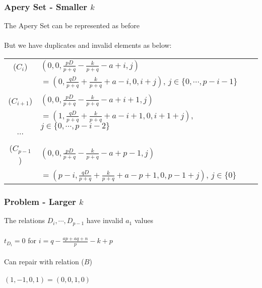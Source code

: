 \documentclass{beamer}
\begin{document}
\begin{frame}[noframenumbering]
\begin{center}
\frametitle{Apery Set - Smaller $k$}

The Apery Set can be represented as before\\

~\\

But we have duplicates and invalid elements as below:

{\footnotesize
\begin{center}
\begin{tabular}{cl}
($C_{i}$) & $\left(0, 0, \frac{p D}{p + q} - \frac{k}{p + q} - a + i , j\right)$\\
& $ = \left(0, \frac{q D}{p + q} + \frac{k}{p + q} + a - i, 0, i + j\right)$, $j \in \{ 0, \cdots, p - i - 1 \}$\\
 &\\
($C_{i + 1}$) & $\left(0, 0, \frac{p D}{p + q} - \frac{k}{p + q} - a + i + 1 , j\right)$\\
& $ = \left(1, \frac{q D}{p + q} + \frac{k}{p + q} + a - i + 1, 0, i + 1 + j\right)$, $j \in \{ 0, \cdots, p - i - 2 \}$\\
$\cdots$ &\\
 &\\
($C_{p - 1}$) & $\left(0, 0, \frac{p D}{p + q} - \frac{k}{p + q} - a + p - 1, j\right)$\\
& $ = \left(p - i, \frac{q D}{p + q} + \frac{k}{p + q} + a - p + 1, 0, p - 1 + j\right)$, $j \in \{ 0 \}$\\
\end{tabular}
\end{center}
}

\end{center}
\end{frame}


\begin{frame}[noframenumbering]
\begin{center}
\frametitle{Problem - Larger $k$}

The relations $D_i, \cdots, D_{p - 1}$ have invalid $a_1$ values\\

~\\

$t_{D_i} = 0$ for $i = q - \frac{a p + a q + n}{p} - k + p$\\

~\\

Can repair with relation ($B$)\\

~\\

$\left(1, - 1, 0, 1\right) = \left(0, 0, 1, 0\right)$

\end{center}
\end{frame}
\end{document}
